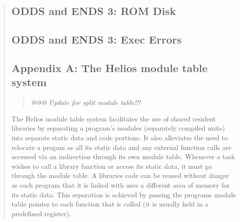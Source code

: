 \begin {quote}
\subsection*{ODDS and ENDS 3: ROM Disk}



\subsection*{ODDS and ENDS 3: Exec Errors}



\subsection*{Appendix A: The Helios module table system}

\begin{quote}
\it
@@@ Update for split module table!!!
\rm
\end{quote}

The Helios module table system facilitates the use of shared resident
libraries by separating a program's
modules (separately compiled units) into separate static data and code
portions. It also alleviates the need to relocate a progam as all its
static data and any external function calls are accessed via an indirection
through its own module table.
Whenever a task wishes to call a library function or access its static
data, it must go through the module table.
A libraries code can be reused without danger as each program that it is
linked with uses a different area of memory for its static data. This 
separation is
achieved by passing the programs module table pointer to each function
that is called (it is usually held in a predefined register).
\vspace{0.25cm}


\end{quote}
